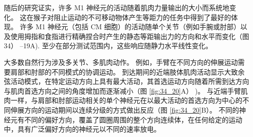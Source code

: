 随后的研究证实，许多 M1 神经元的活动随着肌肉力量输出的大小而系统地变化。 这在猴子对阻止运动的不可移动物体产生等距力的任务中得到了最好的体现。 许多 M1 神经元（包括 CM 细胞）的活动随单个关节（例如手腕或肘部）以及使用拇指和食指进行精确捏合时产生的静态等距输出力的方向和水平而变化（图 34） –19A). 至少在部分测试范围内，这些响应随静力水平线性变化。

大多数自然行为涉及多关节、多肌肉动作。 例如，手臂在不同方向的伸展运动需要肩部和肘部的不同模式的协调运动。 
到达期间的近端肢体肌肉活动显示大致余弦活动模式，在特定运动方向上具有最大活动，其首选运动方向随着所需到达方向与肌肉首选方向之间的角度增加而逐渐减小（图 \ref{fig:34_20}A） )。
与近端手臂肌肉一样，与肩部和肘部运动相关的单个神经元在以最大活动的首选方向为中心的不同伸展方向的运动期间以连续分级的方式做出反应（图 \ref{fig:34_20}B）。 不同的神经元有不同的偏好方向，覆盖了圆圈周围的整个方向连续体，在任何给定的运动中，具有广泛偏好方向的神经元以不同的速率放电。

